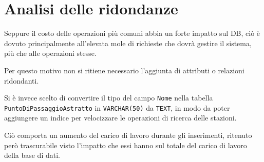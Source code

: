 \documentclass[a4paper,12pt]{report}
\begin{document}
	\section{Analisi delle ridondanze}
	\par Seppure il costo delle operazioni più comuni abbia un forte impatto sul DB, ciò è dovuto principalmente all'elevata mole di richieste che dovrà gestire il sistema, più che alle operazioni stesse.
	\par Per questo motivo non si ritiene necessario l'aggiunta di attributi o relazioni ridondanti.
	\par Si è invece scelto di convertire il tipo del campo \texttt{Nome} nella tabella \texttt{PuntoDiPassaggioAstratto} in \texttt{VARCHAR(50)} da \texttt{TEXT}, in modo da poter aggiungere un indice per velocizzare le operazioni di ricerca delle stazioni.
	\par Ciò comporta un aumento del carico di lavoro durante gli inserimenti, ritenuto però trascurabile visto l'impatto che essi hanno sul totale del carico di lavoro della base di dati.
\end{document}
